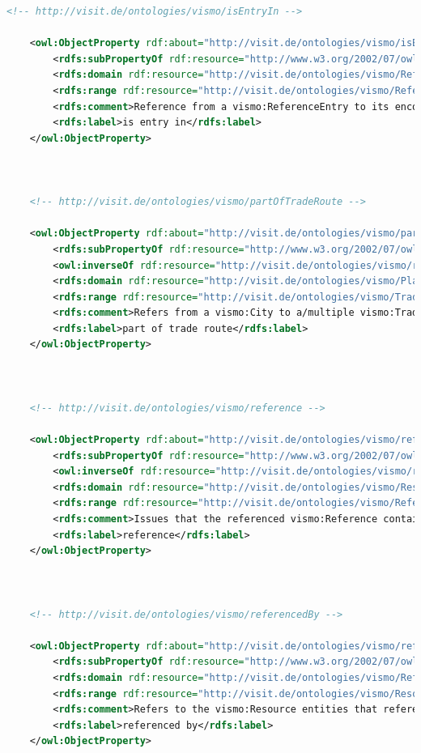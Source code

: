 \begin{lstlisting}[caption={VisMo Ontologie in der letzten (englischen) Version.},label={lst:vismo},captionpos=b,language=xml]
    <!-- http://visit.de/ontologies/vismo/isEntryIn -->

    <owl:ObjectProperty rdf:about="http://visit.de/ontologies/vismo/isEntryIn">
        <rdfs:subPropertyOf rdf:resource="http://www.w3.org/2002/07/owl#topObjectProperty"/>
        <rdfs:domain rdf:resource="http://visit.de/ontologies/vismo/ReferenceEntry"/>
        <rdfs:range rdf:resource="http://visit.de/ontologies/vismo/Reference"/>
        <rdfs:comment>Reference from a vismo:ReferenceEntry to its encompassing vismo:Resource.</rdfs:comment>
        <rdfs:label>is entry in</rdfs:label>
    </owl:ObjectProperty>
    


    <!-- http://visit.de/ontologies/vismo/partOfTradeRoute -->

    <owl:ObjectProperty rdf:about="http://visit.de/ontologies/vismo/partOfTradeRoute">
        <rdfs:subPropertyOf rdf:resource="http://www.w3.org/2002/07/owl#topObjectProperty"/>
        <owl:inverseOf rdf:resource="http://visit.de/ontologies/vismo/routeLocation"/>
        <rdfs:domain rdf:resource="http://visit.de/ontologies/vismo/Place"/>
        <rdfs:range rdf:resource="http://visit.de/ontologies/vismo/Traderoute"/>
        <rdfs:comment>Refers from a vismo:City to a/multiple vismo:TradeRoute resource, indicating the given city is part of a trade route and therefore its associated trade.</rdfs:comment>
        <rdfs:label>part of trade route</rdfs:label>
    </owl:ObjectProperty>
    


    <!-- http://visit.de/ontologies/vismo/reference -->

    <owl:ObjectProperty rdf:about="http://visit.de/ontologies/vismo/reference">
        <rdfs:subPropertyOf rdf:resource="http://www.w3.org/2002/07/owl#topObjectProperty"/>
        <owl:inverseOf rdf:resource="http://visit.de/ontologies/vismo/referencedBy"/>
        <rdfs:domain rdf:resource="http://visit.de/ontologies/vismo/Resource"/>
        <rdfs:range rdf:resource="http://visit.de/ontologies/vismo/Reference"/>
        <rdfs:comment>Issues that the referenced vismo:Reference contains further and descriptive information about the given vismo:Resource entity.</rdfs:comment>
        <rdfs:label>reference</rdfs:label>
    </owl:ObjectProperty>
    


    <!-- http://visit.de/ontologies/vismo/referencedBy -->

    <owl:ObjectProperty rdf:about="http://visit.de/ontologies/vismo/referencedBy">
        <rdfs:subPropertyOf rdf:resource="http://www.w3.org/2002/07/owl#topObjectProperty"/>
        <rdfs:domain rdf:resource="http://visit.de/ontologies/vismo/Reference"/>
        <rdfs:range rdf:resource="http://visit.de/ontologies/vismo/Resource"/>
        <rdfs:comment>Refers to the vismo:Resource entities that reference this vismo:Reference and therefore this entity contains further and descriptive information about the resource entities.</rdfs:comment>
        <rdfs:label>referenced by</rdfs:label>
    </owl:ObjectProperty>
    



\end{lstlisting}
